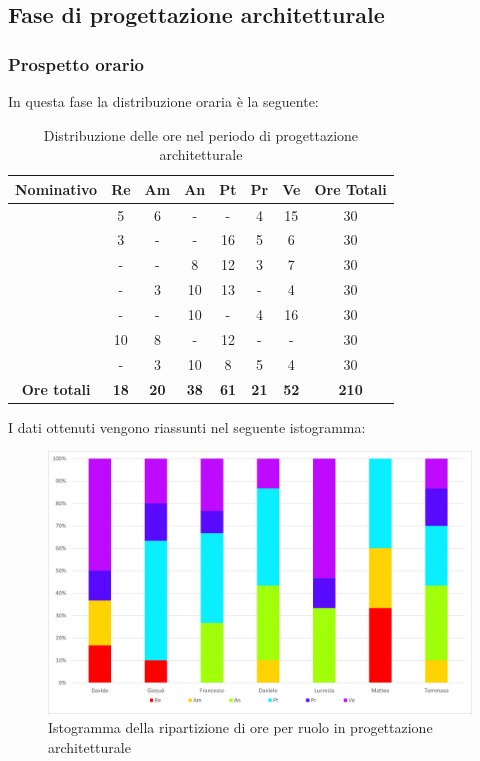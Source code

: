 \subsection{Fase di progettazione architetturale}
\subsubsection{Prospetto orario}
In questa fase la distribuzione oraria è la seguente:
\begin{table}[H]
		\begin{center}
			\setlength{\aboverulesep}{0pt}
			\setlength{\belowrulesep}{0pt}
			\setlength{\extrarowheight}{.75ex}
			\begin{tabular}{ c c c c c c c c }
				\rowcolor{AzzurroGruppo!30} 
				\textbf{Nominativo} & \textbf{Re} & \textbf{Am} & \textbf{An} & \textbf{Pt} & \textbf{Pr} & \textbf{Ve} & \textbf{Ore Totali}  \\
				\toprule
				\Davide    & 5  & 6 & -  & -  & 4 & 15 & 30 \\
				\Giosue    & 3  & - & -  & 16 & 5 & 6  & 30 \\
				\Francesco & -  & - & 8  & 12 & 3 & 7  & 30\\
				\Daniele   & -  & 3 & 10 & 13 & - & 4  & 30\\
				\Lucrezia  & -  & - & 10 & -  & 4 & 16 & 30\\
				\Matteo    & 10 & 8 & -  & 12 & - & -  & 30\\
				\Tommaso   & -  & 3 & 10 & 8  & 5 & 4  & 30\\
				 \textbf{Ore totali} & \textbf{18} & \textbf{20} & \textbf{38} & \textbf{61} & \textbf{21} & \textbf{52} & \textbf{210} \\
				\bottomrule
			\end{tabular}
			\caption{Distribuzione delle ore nel periodo di  progettazione architetturale}
		\end{center}
	\end{table}
I dati ottenuti vengono riassunti nel seguente istogramma:
\begin{figure}[H]
    \centering
    \includegraphics[scale = 0.5]{components/img/Architettura-isto.png}
    \caption{Istogramma della ripartizione di ore per ruolo in progettazione architetturale}
    \label{fig:Istogramma ripartizione ore , fase di progettazione architetturale}
\end{figure}

